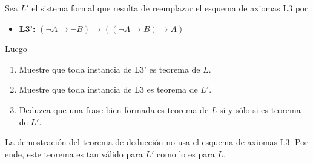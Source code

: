 \begin{exercise}
Sea $L'$ el sistema formal que resulta de reemplazar el esquema de axiomas L3 por
\begin{itemize}
    \item \textbf{L3':} $(\neg A \to \neg B) \to ((\neg A \to B) \to A)$
\end{itemize}
Luego
\begin{enumerate}
    \item Muestre que toda instancia de L3' es teorema de $L$.
    \item Muestre que toda instancia de L3 es teorema de $L'$.
    \item Deduzca que una frase bien formada es teorema de $L$ si y sólo si es teorema de $L'$.
\end{enumerate}
\end{exercise}

\begin{remark}
La demostración del teorema de deducción no usa el esquema de axiomas L3. Por ende, este teorema es tan válido para $L'$ como lo es para $L$.
\end{remark}

